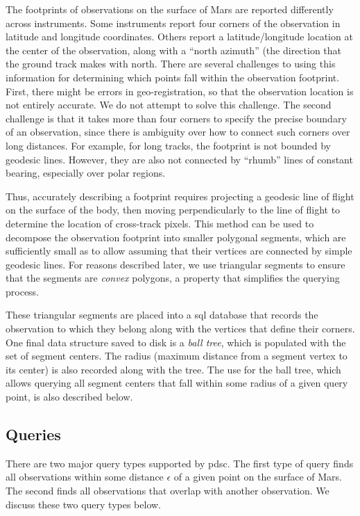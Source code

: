 \documentclass[twocolumn]{extarticle}
\begin{document}
The footprints of observations on the surface of Mars are reported differently
across instruments. Some instruments report four corners of the observation in
latitude and longitude coordinates. Others report a latitude/longitude
location at the center of the observation, along with a ``north azimuth'' (the
direction that the ground track makes with north. There are several challenges
to using this information for determining which points fall within the
observation footprint. First, there might be errors in geo-registration, so that
the observation location is not entirely accurate. We do not attempt to solve
this challenge. The second challenge is that it takes more than four corners to
specify the precise boundary of an observation, since there is ambiguity over
how to connect such corners over long distances. For example, for long tracks,
the footprint is not bounded by geodesic lines. However, they are also not
connected by ``rhumb'' lines of constant bearing, especially over polar regions.

Thus, accurately describing a footprint requires projecting a geodesic line of
flight on the surface of the body, then moving perpendicularly to the line of
flight to determine the location of cross-track pixels. This method can be used
to decompose the observation footprint into smaller polygonal segments, which
are sufficiently small as to allow assuming that their vertices are connected by
simple geodesic lines. For reasons described later, we use triangular segments
to ensure that the segments are \emph{convex} polygons, a property that
simplifies the querying process.

These triangular segments are placed into a \ac{sql} database that records the
observation to which they belong along with the vertices that define their
corners. One final data structure saved to disk is a \emph{ball tree}, which is
populated with the set of segment centers. The radius (maximum distance from a
segment vertex to its center) is also recorded along with the tree. The use for
the ball tree, which allows querying all segment centers that fall within some
radius of a given query point, is also described below.

\subsection*{Queries}

There are two major query types supported by \ac{pdsc}. The first type of query
finds all observations within some distance $\epsilon$ of a given point on the
surface of Mars. The second finds all observations that overlap with another
observation. We discuss these two query types below.
\end{document}
